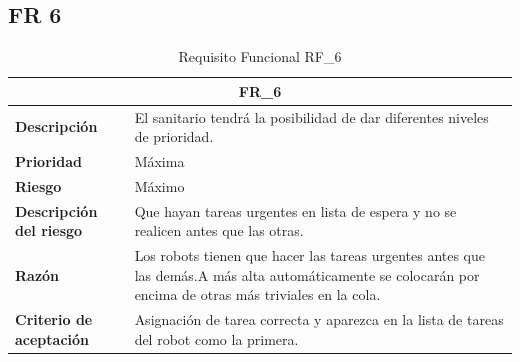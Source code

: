 \documentclass{scrreprt}
\begin{document}
\subsection{FR 6}
    \begin{table}[H]
    
    \label{tab:my-table}
    
    \begin{tabular}{|p{5cm}|p{11cm}|}
    \hline
    \multicolumn{2}{|c|}{\textbf{FR_6}} \\
    \hline
    \textbf{Descripción  }                      & El sanitario tendrá la posibilidad de dar diferentes niveles de prioridad.                                                                            \\ \hline
    \textbf{Prioridad}                          & Máxima                                                                                              \\ \hline
    \textbf{Riesgo}                          & Máximo                                                                                                \\ \hline
    \textbf{Descripción del riesgo}                    & Que hayan tareas urgentes en lista de espera y no se realicen antes que las otras.                                                                           \\ \hline
    \textbf{Razón}                   & Los robots tienen que hacer las tareas urgentes antes que las demás.A más alta automáticamente se colocarán por encima de otras más triviales en la cola.                                                                                        \\ \hline
     \textbf{Criterio de aceptación}                    & Asignación de tarea correcta y aparezca en la lista de tareas del robot como la primera.  \\ \hline
    \end{tabular}%
    
    \caption{Requisito Funcional RF_6}
\end{table}
\end{document}
